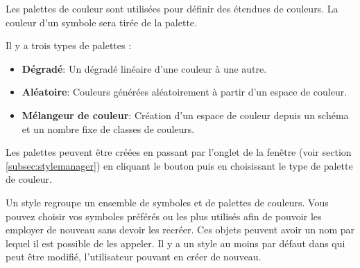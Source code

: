 Les palettes de couleur sont utilisées pour définir des étendues de couleurs. La 
couleur d'un symbole sera tirée de la palette.

Il y a trois types de palettes :

\begin{itemize}[label=--]
\item \textbf{Dégradé}: Un dégradé linéaire d'une couleur à une autre.
\item \textbf{Aléatoire}: Couleurs générées aléatoirement à partir d'un espace de couleur.
\item \textbf{Mélangeur de couleur}: Création d'un espace de couleur depuis un schéma et un nombre fixe de classes de couleurs.
\end{itemize}

Les palettes peuvent être créées en passant par l'onglet  de la 
fenêtre  (voir section \ref{subsec:stylemanager}) 
en cliquant le bouton  puis en choisissant le type de palette de couleur.


Un style regroupe un ensemble de symboles et de palettes de couleurs. Vous pouvez 
choisir vos symboles préférés ou les plus utilisés afin de pouvoir les employer de 
nouveau sans devoir les recréer. Ces objets peuvent avoir un nom par lequel il est 
possible de les appeler. Il y a un style au moins par défaut dans \qg qui peut être 
modifié, l'utilisateur pouvant en créer de nouveau.

